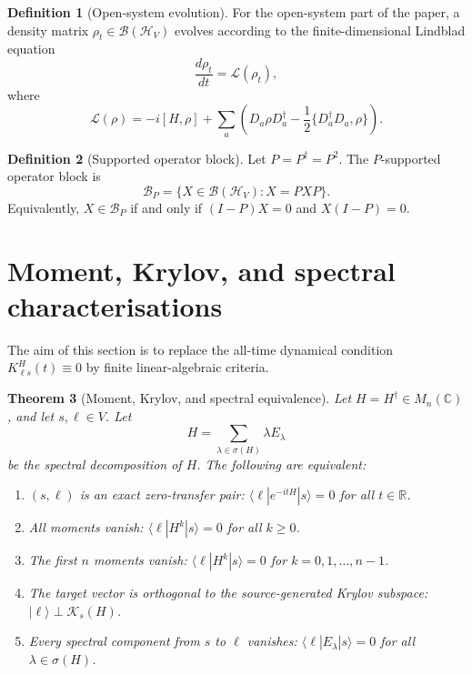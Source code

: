 \documentclass[11pt]{article}
\newtheorem{theorem}{Theorem}[section]
\theoremstyle{definition}
\newtheorem{definition}[theorem]{Definition}
\newcommand{\cH}{\mathcal H}
\newcommand{\cK}{\mathcal K}
\newcommand{\R}{\mathbb R}
\newcommand{\C}{\mathbb C}
\begin{document}
\begin{definition}[Open-system evolution]
For the open-system part of the paper, a density matrix $\rho_t\in\mathcal B(\cH_V)$ evolves according to the finite-dimensional Lindblad equation
\[
\frac{d\rho_t}{dt}=\mathcal L(\rho_t),
\]
where
\[
\mathcal L(\rho)=-i[H,\rho]+\sum_a\left(D_a\rho D_a^\dagger-\frac12\{D_a^\dagger D_a,\rho\}\right).
\]
\end{definition}

\begin{definition}[Supported operator block]
Let $P=P^\dagger=P^2$. The $P$-supported operator block is
\[
\mathcal B_P=\{X\in\mathcal B(\cH_V):X=PXP\}.
\]
Equivalently, $X\in\mathcal B_P$ if and only if $(I-P)X=0$ and $X(I-P)=0$.
\end{definition}

\section{Moment, Krylov, and spectral characterisations}
The aim of this section is to replace the all-time dynamical condition $K^H_{\ell s}(t)\equiv0$ by finite linear-algebraic criteria.

\begin{theorem}[Moment, Krylov, and spectral equivalence]
Let $H=H^\dagger\in M_n(\C)$, and let $s,\ell\in V$. Let
\[
H=\sum_{\lambda\in\sigma(H)}\lambda E_\lambda
\]
be the spectral decomposition of $H$. The following are equivalent:
\begin{enumerate}[label=(\roman*)]
\item $(s,\ell)$ is an exact zero-transfer pair: $\langle \ell|e^{-itH}|s\rangle=0$ for all $t\in\R$.
\item All moments vanish: $\langle \ell|H^k|s\rangle=0$ for all $k\ge0$.
\item The first $n$ moments vanish: $\langle \ell|H^k|s\rangle=0$ for $k=0,1,\ldots,n-1$.
\item The target vector is orthogonal to the source-generated Krylov subspace: $|\ell\rangle\perp \cK_s(H)$.
\item Every spectral component from $s$ to $\ell$ vanishes: $\langle \ell|E_\lambda|s\rangle=0$ for all $\lambda\in\sigma(H)$.
\end{enumerate}
\end{theorem}
\end{document}

